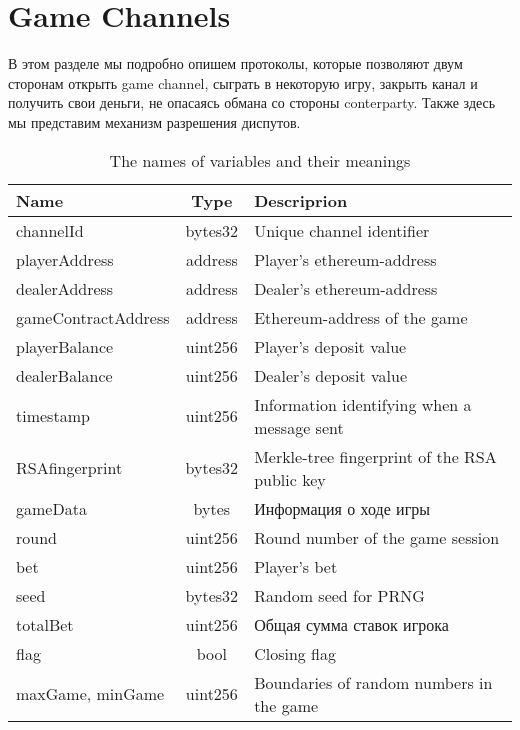  	\section{Game Channels} \label{gamechannel}
В этом разделе мы подробно опишем протоколы, которые позволяют двум сторонам открыть game channel, сыграть в некоторую игру, закрыть канал и получить свои деньги, не опасаясь обмана со стороны conterparty. Также здесь мы представим механизм разрешения диспутов.\\

\begin{table}[h]

\caption{The names of variables and their meanings}
\begin{tabular}{|l|c|l|}
\hline
Name&Type&Descriprion\\
\hline
channelId & bytes32 & Unique channel identifier\\ 

playerAddress & address & Player's ethereum-address\\            
dealerAddress & address & Dealer's ethereum-address\\  
gameContractAddress & address & Ethereum-address of the game\\             
playerBalance & uint256 & Player's deposit value\\                   
dealerBalance & uint256 & Dealer's deposit value\\                   
timestamp & uint256 &  Information identifying when a message sent\\                  
RSAfingerprint & bytes32 &  Merkle-tree fingerprint of the RSA public key\\  
gameData & bytes & Информация о ходе игры\\
round & uint256 & Round number of the game session \\
bet & uint256 & Player's bet \\
seed & bytes32 & Random seed for PRNG\\
totalBet & uint256 & Общая сумма ставок игрока \\
flag & bool &Closing flag \\
maxGame, minGame & uint256 & Boundaries of random numbers in the game\\
\hline
\end{tabular}
\end{table}

